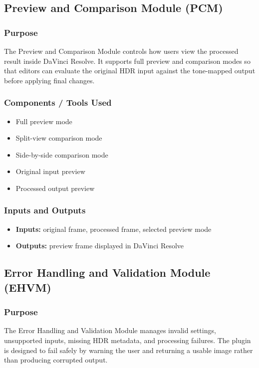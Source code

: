 \documentclass{article}
\begin{document}
\subsection{Preview and Comparison Module (PCM)}

\subsubsection*{Purpose}
The Preview and Comparison Module controls how users view the processed result inside DaVinci Resolve. It supports full preview and comparison modes so that editors can evaluate the original HDR input against the tone-mapped output before applying final changes.

\subsubsection*{Components / Tools Used}
\begin{itemize}
    \item Full preview mode
    \item Split-view comparison mode
    \item Side-by-side comparison mode
    \item Original input preview
    \item Processed output preview
\end{itemize}

\subsubsection*{Inputs and Outputs}
\begin{itemize}
    \item \textbf{Inputs:} original frame, processed frame, selected preview mode
    \item \textbf{Outputs:} preview frame displayed in DaVinci Resolve
\end{itemize}


\subsection{Error Handling and Validation Module (EHVM)}

\subsubsection*{Purpose}
The Error Handling and Validation Module manages invalid settings, unsupported inputs, missing HDR metadata, and processing failures. The plugin is designed to fail safely by warning the user and returning a usable image rather than producing corrupted output.
\end{document}

